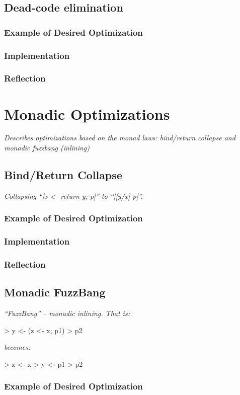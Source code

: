 \documentclass[12pt]{report}
\begin{document}
\section{Dead-code elimination}
\subsection{Example of Desired Optimization}
\subsection{Implementation}
\subsection{Reflection}

\chapter{Monadic Optimizations}
\emph{Describes optimizations based on the monad laws: bind/return collapse and
  monadic fuzzbang (inlining)}

\section{Bind/Return Collapse}
\emph{Collapsing ``|x <- return y; p|'' to ``|[y/x] p|''.}
\subsection{Example of Desired Optimization}
\subsection{Implementation}
\subsection{Reflection}

\section{Monadic FuzzBang}
\emph{``FuzzBang'' --  monadic inlining. That is:}

> y <- (z <- x; p1)
> p2

\noindent
\emph{becomes:}

> z <- x
> y <- p1
> p2

\subsection{Example of Desired Optimization}
\end{document}
